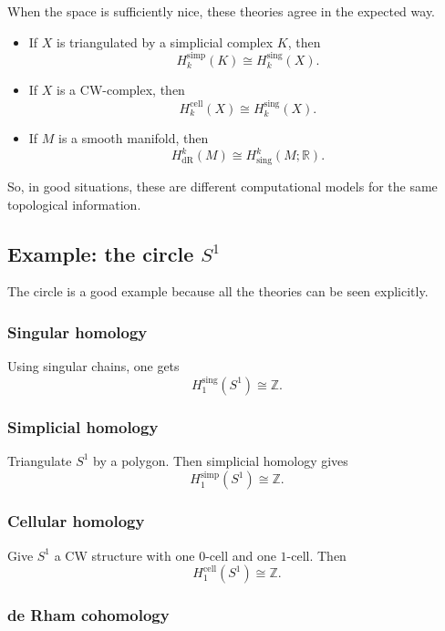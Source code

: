 \documentclass[12pt,a4paper]{article}
\theoremstyle{notespace}
\begin{document}
When the space is sufficiently nice, these theories agree in the expected way.

\begin{itemize}
	\item If \(X\) is triangulated by a simplicial complex \(K\), then
	\[
	H_k^{\mathrm{simp}}(K)\cong H_k^{\mathrm{sing}}(X).
	\]
	
	\item If \(X\) is a CW-complex, then
	\[
	H_k^{\mathrm{cell}}(X)\cong H_k^{\mathrm{sing}}(X).
	\]
	
	\item If \(M\) is a smooth manifold, then
	\[
	H^k_{\mathrm{dR}}(M)\cong H^k_{\mathrm{sing}}(M;\mathbb R).
	\]
\end{itemize}

So, in good situations, these are different computational models for the same topological information.

\subsection{ Example: the circle \texorpdfstring{$S^1$}{S1}}

The circle is a good example because all the theories can be seen explicitly.

\subsubsection{Singular homology}

Using singular chains, one gets
\[
H_1^{\mathrm{sing}}(S^1)\cong \mathbb Z.
\]

\subsubsection{Simplicial homology}

Triangulate \(S^1\) by a polygon. Then simplicial homology gives
\[
H_1^{\mathrm{simp}}(S^1)\cong \mathbb Z.
\]

\subsubsection{Cellular homology}

Give \(S^1\) a CW structure with one \(0\)-cell and one \(1\)-cell. Then
\[
H_1^{\mathrm{cell}}(S^1)\cong \mathbb Z.
\]

\subsubsection{de Rham cohomology}
\end{document}
